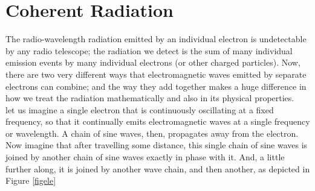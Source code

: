 \documentclass[10pt]{report}
\begin{document}
\section{Coherent Radiation}
The radio-wavelength radiation emitted by an individual electron is undetectable by any radio telescope; the radiation we detect is the sum of many individual emission events by many individual electrons (or other charged particles).  Now, there are two very different ways that electromagnetic waves emitted by separate electrons can combine; and the way they add together makes a huge difference in how we treat the radiation mathematically and also in its physical properties.  \\
 let us imagine a single electron that is continuously oscillating at a fixed frequency, so that it continually emits electromagnetic waves at a single frequency or wavelength.  A chain of sine waves, then, propagates away from the electron.  Now imagine that after travelling some distance, this single chain of sine waves is joined by another chain of sine waves exactly in phase with it.  And, a little further along, it is joined by another wave chain, and then another, as depicted in Figure \ref{figele}
 
\end{document}
